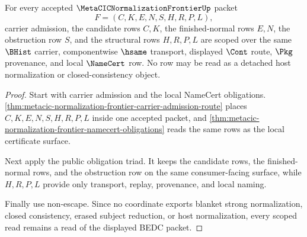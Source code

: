 \begin{theorem}
\label{thm:metacic-normalization-frontier-scope-binding}
For every accepted $\MetaCICNormalizationFrontierUp$ packet
$$
F=(C,K,E,N,S,H,R,P,L),
$$
carrier admission, the candidate rows $C,K$, the finished-normal rows $E,N$,
the obstruction row $S$, and the structural rows $H,R,P,L$ are scoped over the
same $\BHist$ carrier, componentwise $\hsame$ transport, displayed $\Cont$
route, $\Pkg$ provenance, and local $\NameCert$ row. No row may be read as a
detached host normalization or closed-consistency object.
\end{theorem}
\begin{proof}
Start with carrier admission and the local NameCert obligations.
\autoref{thm:metacic-normalization-frontier-carrier-admission-route} places
$C,K,E,N,S,H,R,P,L$ inside one accepted packet, and
\autoref{thm:metacic-normalization-frontier-namecert-obligations} reads the
same rows as the local certificate surface.

Next apply the public obligation triad. It keeps the candidate rows, the
finished-normal rows, and the obstruction row on the same consumer-facing
surface, while $H,R,P,L$ provide only transport, replay, provenance, and local
naming.

Finally use non-escape. Since no coordinate exports blanket strong
normalization, closed consistency, erased subject reduction, or host
normalization, every scoped read remains a read of the displayed BEDC packet.
\end{proof}

